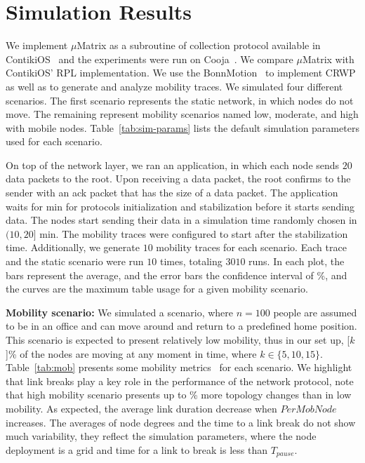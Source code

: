 

\section{Simulation Results}
\label{sec:evaluation}

We implement $\mu$Matrix as a subroutine of collection protocol available in ContikiOS~\cite{dunkels:2004} and the experiments were run on Cooja~\cite{eriksson:2009}. We compare $\mu$Matrix with ContikiOS' RPL implementation. We use the BonnMotion~\cite{aschenbruck2010bonnmotion} to implement CRWP as well as to generate and analyze mobility traces. We simulated four different scenarios. The first scenario represents the static network, in which nodes do not move. The remaining represent mobility scenarios named low, moderate, and high with mobile nodes. Table~\ref{tab:sim-params} lists the default simulation parameters used for each scenario. 

On top of the network layer, we ran an application, in which each node sends $20$ data packets to the root. Upon receiving a data packet, the root confirms to the sender with an ack packet that has the size of a data packet. The application waits for \unit[10]{min} for protocols initialization and stabilization before it starts sending data. The nodes start sending their data in a simulation time randomly chosen in $(10, 20]$ min. The mobility traces were configured to start after the stabilization time. Additionally, we generate $10$ mobility traces for each scenario. Each trace and the static scenario were run $10$ times, totaling $3010$ runs. In each plot, the bars represent the average, and the error bars the confidence interval of \unit[95]{\%}, and the curves are the maximum table usage for a given mobility scenario.



\noindent \textbf{Mobility scenario:} We simulated a scenario, where $n=100$ people are assumed to be in an office and can move around and return to a predefined home position. This scenario is expected to present relatively low mobility, thus in our set up, \unit[$k$]{\%} of the nodes are moving at any moment in time, where $k \in \{5, 10, 15\}$. Table~\ref{tab:mob} presents some mobility metrics~\cite{aschenbruck2010bonnmotion} for each scenario. We highlight that link breaks play a key role in the performance of the network protocol, note that high mobility scenario presents up to \unit[20]{\%} more topology changes than in low mobility. As expected, the average link duration decrease when $PerMobNode$ increases. The averages of node degrees and the time to a link break do not show much variability, they reflect the simulation parameters, where the node deployment is a grid and time for a link to break is less than $T_{pause}$. 

